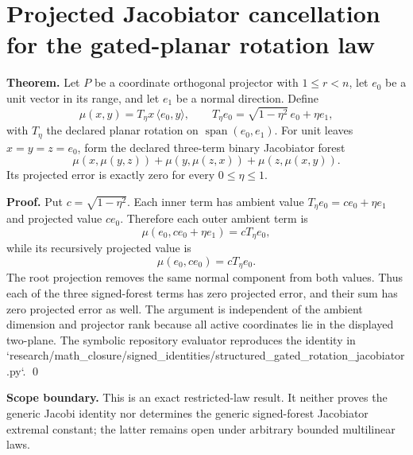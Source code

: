 \section*{Projected Jacobiator cancellation for the gated-planar rotation law}
\label{sec:structured-gated-rotation-jacobiator}

\textbf{Theorem.} Let $P$ be a coordinate orthogonal projector with
$1\le r<n$, let $e_0$ be a unit vector in its range, and let $e_1$ be a
normal direction. Define
\[
  \mu(x,y)=T_\eta x\,\langle e_0,y\rangle,
  \qquad T_\eta e_0=\sqrt{1-\eta^2}\,e_0+\eta e_1,
\]
with $T_\eta$ the declared planar rotation on
$\operatorname{span}(e_0,e_1)$. For unit leaves $x=y=z=e_0$, form the
declared three-term binary Jacobiator forest
\[
  \mu(x,\mu(y,z))+\mu(y,\mu(z,x))+\mu(z,\mu(x,y)).
\]
Its projected error is exactly zero for every $0\le\eta\le1$.

\textbf{Proof.} Put $c=\sqrt{1-\eta^2}$. Each inner term has ambient value
$T_\eta e_0=c e_0+\eta e_1$ and projected value $c e_0$. Therefore each
outer ambient term is
\[
  \mu(e_0,c e_0+\eta e_1)=cT_\eta e_0,
\]
while its recursively projected value is
\[
  \mu(e_0,c e_0)=cT_\eta e_0.
\]
The root projection removes the same normal component from both values.
Thus each of the three signed-forest terms has zero projected error, and
their sum has zero projected error as well. The argument is independent of
the ambient dimension and projector rank because all active coordinates lie
in the displayed two-plane. The symbolic repository evaluator reproduces
the identity in
`research/math_closure/signed_identities/structured_gated_rotation_jacobiator.py`.
\qed

\textbf{Scope boundary.} This is an exact restricted-law result. It neither
proves the generic Jacobi identity nor determines the generic signed-forest
Jacobiator extremal constant; the latter remains open under arbitrary bounded
multilinear laws.
